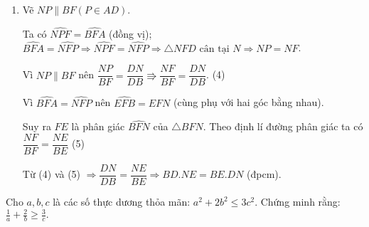 \begin{ex}
{\begin{enumerate}[1)]
		Có $\widehat{BEA}=\widehat{CED}$, $\widehat{AFM}=\widehat{CFD}$.\hfill (3)
		
		Từ (1), (2) và (3) suy ra $\widehat{BFA}=\widehat{AFM}$, do đó $FA$ là tia phân giác của $\widehat{BFM}$.
		
		\item Vẽ $NP \parallel BF (P \in AD)$.
		
		Ta có $\widehat{NPF}=\widehat{BFA}$ (đồng vị); $\widehat{BFA}=\widehat{NFP} \Rightarrow \widehat{NPF}=\widehat{NFP} \Rightarrow \triangle NFD \text{ cân tại } N \Rightarrow NP=NF$.
		
		Vì $NP \parallel BF$ nên $\dfrac{NP}{BF}=\dfrac{DN}{DB} \Rrightarrow \dfrac{NF}{BF}=\dfrac{DN}{DB}$. \hfill (4)
		
		Vì $\widehat{BFA}=\widehat{NFP}$ nên $\widehat{EFB}=\widehat{EFN}$ (cùng phụ với hai góc bằng nhau).
		
		Suy ra $FE$ là phân giác $\widehat{BFN}$ của $\triangle BFN$. Theo định lí đường phân giác ta có $\dfrac{NF}{BF}=\dfrac{NE}{BE}$ \hfill (5)
		
		Từ (4) và (5) $\Rightarrow \dfrac{DN}{DB}=\dfrac{NE}{BE} \Rightarrow BD.NE=BE.DN$ (đpcm).
	\end{enumerate}
}
\end{ex}

\begin{ex}%
	Cho $a,b,c$ là các số thực dương thỏa mãn: $a^2+2b^2 \le 3c^2$. Chứng minh rằng: $ \displaystyle \frac{1}{a}+ \frac{2}{b} \ge \frac{3}{c}.$
\end{ex}
